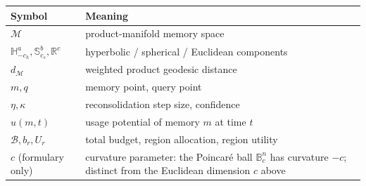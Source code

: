 \documentclass[11pt,a4paper]{article}
\newcommand{\M}{\mathcal{M}}
\newcommand{\B}{\mathbb{B}}
\newcommand{\R}{\mathbb{R}}
\newcommand{\Hyp}{\mathbb{H}}
\newcommand{\Sph}{\mathbb{S}}
\begin{document}
\begin{center}
\begin{tabular}{ll}
\toprule
Symbol & Meaning \\
\midrule
$\M$ & product-manifold memory space \\
$\Hyp^a_{-c_h}, \Sph^b_{c_s}, \R^c$ & hyperbolic / spherical / Euclidean components \\
$d_{\M}$ & weighted product geodesic distance \\
$m, q$ & memory point, query point \\
$\eta, \kappa$ & reconsolidation step size, confidence \\
$u(m,t)$ & usage potential of memory $m$ at time $t$ \\
$\mathcal{B}, b_r, U_r$ & total budget, region allocation, region utility \\
$c$ (formulary only) & curvature parameter: the Poincar\'e ball $\B^n_c$ has curvature $-c$; distinct from the Euclidean dimension $c$ above \\
\bottomrule
\end{tabular}
\end{center}
\end{document}
